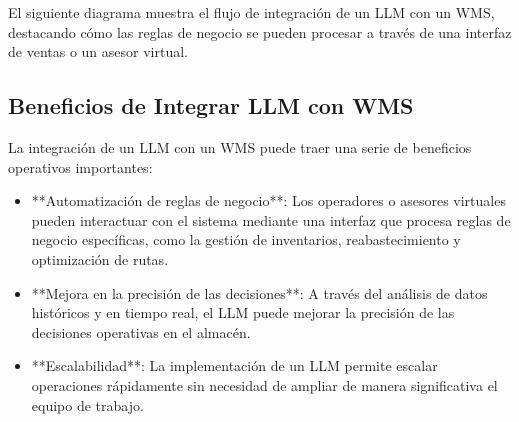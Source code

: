 El siguiente diagrama muestra el flujo de integración de un LLM con un WMS, destacando cómo las reglas de negocio se pueden procesar a través de una interfaz de ventas o un asesor virtual.


\subsection{Beneficios de Integrar LLM con WMS}

La integración de un LLM con un WMS puede traer una serie de beneficios operativos importantes:

\begin{itemize}
    \item **Automatización de reglas de negocio**: Los operadores o asesores virtuales pueden interactuar con el sistema mediante una interfaz que procesa reglas de negocio específicas, como la gestión de inventarios, reabastecimiento y optimización de rutas.
    \item **Mejora en la precisión de las decisiones**: A través del análisis de datos históricos y en tiempo real, el LLM puede mejorar la precisión de las decisiones operativas en el almacén.
    \item **Escalabilidad**: La implementación de un LLM permite escalar operaciones rápidamente sin necesidad de ampliar de manera significativa el equipo de trabajo.
\end{itemize}


